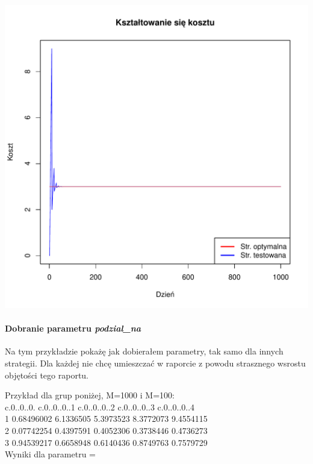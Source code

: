 \documentclass{article}
\begin{document}
\begin{center}
\includegraphics[scale=0.52]{wykresy/problemy/Ksztaltowanie_sie_kosztu_troche_za_maly.pdf}
\end{center}
\paragraph{Dobranie parametru \textit{podzial\_na}}
Na tym przykładzie pokażę jak dobierałem parametry, tak samo dla innych strategii. Dla każdej
nie chcę umieszczać w raporcie z powodu strasznego wsrostu objętości tego raportu.

Przykład dla grup poniżej, M=1000 i M=100:\\
c.0..0..0. c.0..0..0..1 c.0..0..0..2 c.0..0..0..3 c.0..0..0..4\\
1 0.68496002    6.1336505    5.3973523    8.3772073    9.4554115\\
2 0.07742254    0.4397591    0.4052306    0.3738446    0.4736273\\
3 0.94539217    0.6658948    0.6140436    0.8749763    0.7579729\\

Wyniki dla parametru = 
\end{document}
